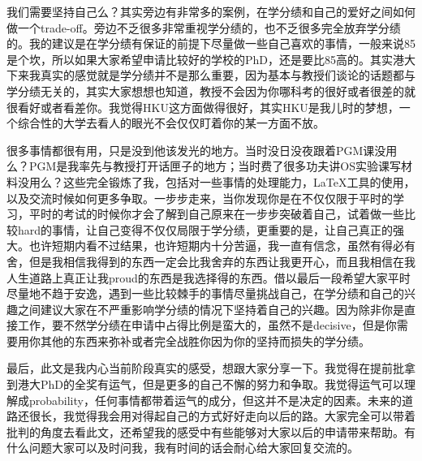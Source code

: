 我们需要坚持自己么？其实旁边有非常多的案例，在学分绩和自己的爱好之间如何做一个trade-off。旁边不乏很多非常重视学分绩的，也不乏很多完全放弃学分绩的。我的建议是在学分绩有保证的前提下尽量做一些自己喜欢的事情，一般来说85是个坎，所以如果大家希望申请比较好的学校的PhD，还是要比85高的。其实港大下来我真实的感觉就是学分绩并不是那么重要，因为基本与教授们谈论的话题都与学分绩无关的，其实大家想想也知道，教授不会因为你哪科考的很好或者很差的就很看好或者看差你。我觉得HKU这方面做得很好，其实HKU是我儿时的梦想，一个综合性的大学去看人的眼光不会仅仅盯着你的某一方面不放。\par


很多事情都很有用，只是没到他该发光的地方。当时没日没夜跟着PGM课没用么？PGM是我率先与教授打开话匣子的地方；当时费了很多功夫讲OS实验课写材料没用么？这些完全锻炼了我，包括对一些事情的处理能力，\LaTeX{}工具的使用，以及交流时候如何更多争取。一步步走来，当你发现你是在不仅仅限于平时的学习，平时的考试的时候你才会了解到自己原来在一步步突破着自己，试着做一些比较hard的事情，让自己变得不仅仅局限于学分绩，更重要的是，让自己真正的强大。也许短期内看不过结果，也许短期内十分苦逼，我一直有信念，虽然有得必有舍，但是我相信我得到的东西一定会比我舍弃的东西让我更开心，而且我相信在我人生道路上真正让我proud的东西是我选择得的东西。借以最后一段希望大家平时尽量地不趋于安逸，遇到一些比较棘手的事情尽量挑战自己，在学分绩和自己的兴趣之间建议大家在不严重影响学分绩的情况下坚持着自己的兴趣。因为除非你是直接工作，要不然学分绩在申请中占得比例是蛮大的，虽然不是decisive，但是你需要用你其他的东西来弥补或者完全战胜你因为你的坚持而损失的学分绩。\par

最后，此文是我内心当前阶段真实的感受，想跟大家分享一下。我觉得在提前批拿到港大PhD的全奖有运气，但是更多的自己不懈的努力和争取。我觉得运气可以理解成probability，任何事情都带着运气的成分，但这并不是决定的因素。未来的道路还很长，我觉得我会用对得起自己的方式好好走向以后的路。大家完全可以带着批判的角度去看此文，还希望我的感受中有些能够对大家以后的申请带来帮助。有什么问题大家可以及时问我，我有时间的话会耐心给大家回复交流的。